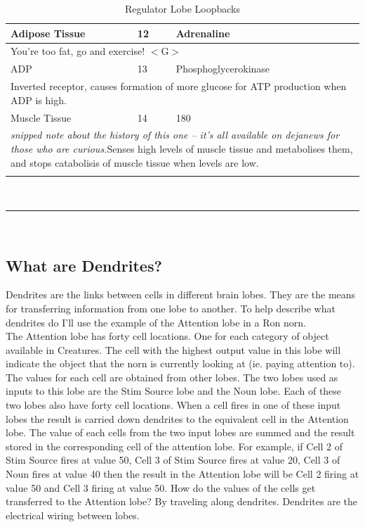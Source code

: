 \documentclass[11pt,twoside,a4paper]{article}
\begin{document}
\begin{longtable}{|p{}|p{}|p{}|}
Adipose Tissue	&	12	&	Adrenaline \\ \hline
\multicolumn{3}{|p{0.90\textwidth}|}{You're too fat, go and exercise! $<$G$>$ } \\ \hline
ADP		&	13	&	Phosphoglycerokinase \\ \hline
\multicolumn{3}{|p{0.90\textwidth}|}{Inverted receptor, causes formation of more glucose for ATP production when ADP is high. } \\ \hline
Muscle Tissue	&	14	&	180 \\ \hline
\multicolumn{3}{|p{0.90\textwidth}|}{\emph{snipped note about the history of this one -- it's all available on dejanews for those who are curious.}Senses high levels of muscle tissue and metabolises them, and stops catabolisis of muscle tissue when levels are low. } \\ \hline
		\hline
	\caption{Regulator Lobe Loopbacks}
	\label{tab:Regulator_Lobe_Loopbacks}\\
\end{longtable}~\\

\rule{10cm}{0.5mm}~\\

\subsection{What are Dendrites?}

Dendrites are the links between cells in different brain lobes. They are the means for transferring information from one lobe to another. To help describe what dendrites do I'll use the example of the Attention lobe in a Ron norn.~\\

The Attention lobe has forty cell locations. One for each category of object available in Creatures. The cell with the highest output value in this lobe will indicate the object that the norn is currently looking at (ie. paying attention to). The values for each cell are obtained from other lobes. The two lobes used as inputs to this lobe are the Stim Source lobe and the Noun lobe. Each of these two lobes also have forty cell locations. When a cell fires in one of these input lobes the result is carried down dendrites to the equivalent cell in the Attention lobe. The value of each cells from the two input lobes are summed and the result stored in the corresponding cell of the attention lobe. For example, if Cell 2 of Stim Source fires at value 50, Cell 3 of Stim Source fires at value 20, Cell 3 of Noun fires at value 40 then the result in the Attention lobe will be Cell 2 firing at value 50 and Cell 3 firing at value 50. How do the values of the cells get transferred to the Attention lobe? By traveling along dendrites. Dendrites are the electrical wiring between lobes.~\\
\end{document}

